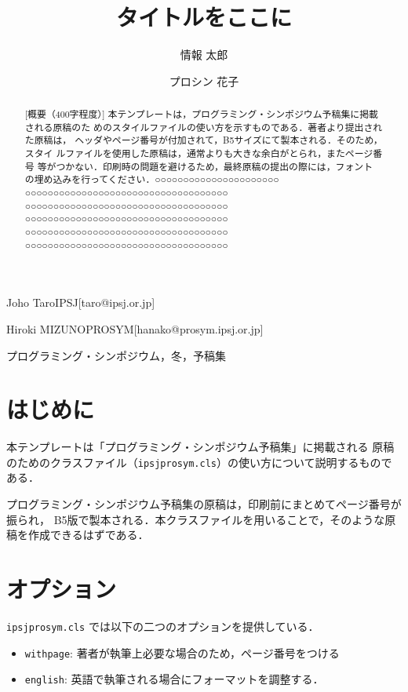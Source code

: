 \documentclass{ipsjprosym}
\begin{document}
\title{タイトルをここに}


\author{情報 太郎}{Joho Taro}{IPSJ}[taro@ipsj.or.jp]
\author{プロシン 花子}{Hiroki MIZUNO}{PROSYM}[hanako@prosym.ipsj.or.jp]

\begin{abstract}
[概要（400字程度）]
本テンプレートは，プログラミング・シンポジウム予稿集に掲載される原稿のた
めのスタイルファイルの使い方を示すものである．著者より提出された原稿は，
ヘッダやページ番号が付加されて，B5サイズにて製本される．そのため，スタイ
ルファイルを使用した原稿は，通常よりも大きな余白がとられ，またページ番号
等がつかない．印刷時の問題を避けるため，最終原稿の提出の際には，フォント
の埋め込みを行ってください．○○○○○○○○○○○○○○○○○○○○○○
○○○○○○○○○○○○○○○○○○○○○○○○○○○○○○○○○○○○
○○○○○○○○○○○○○○○○○○○○○○○○○○○○○○○○○○○○
○○○○○○○○○○○○○○○○○○○○○○○○○○○○○○○○○○○○
○○○○○○○○○○○○○○○○○○○○○○○○○○○○○○○○○○○○
○○○○○○○○○○○○○○○○○○○○○○○○○○○○○○○○○○○○
\end{abstract}

\begin{jkeyword}
プログラミング・シンポジウム，冬，予稿集
\end{jkeyword}

\maketitle

\section{はじめに}

本テンプレートは「プログラミング・シンポジウム予稿集」に掲載される
原稿のためのクラスファイル（\verb|ipsjprosym.cls|）の使い方について説明するものである．

プログラミング・シンポジウム予稿集の原稿は，印刷前にまとめてページ番号が振られ，
B5版で製本される．本クラスファイルを用いることで，そのような原稿を作成できるはずである．

\section{オプション}

\verb|ipsjprosym.cls| では以下の二つのオプションを提供している．
\begin{itemize}
\item \verb|withpage|: 著者が執筆上必要な場合のため，ページ番号をつける
\item \verb|english|: 英語で執筆される場合にフォーマットを調整する．
\end{itemize}
\end{document}
